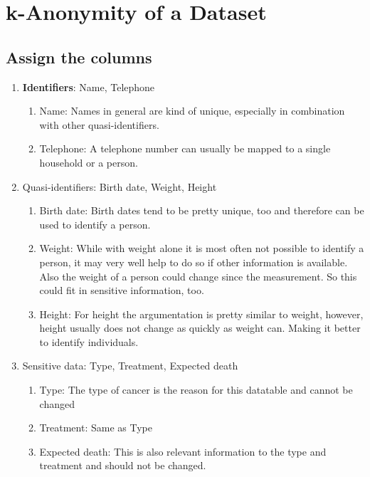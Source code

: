 
\section{k-Anonymity of a Dataset}

\subsection{Assign the columns}
\begin{enumerate}
\item \textbf{Identifiers}: Name, Telephone 
\begin{enumerate}
\item Name: Names in general are kind of unique, especially in combination
with other quasi-identifiers. 
\item Telephone: A telephone number can usually be mapped to a single household
or a person. 
\end{enumerate}
\item Quasi-identifiers: Birth date, Weight, Height 
\begin{enumerate}
\item Birth date: Birth dates tend to be pretty unique, too and therefore
can be used to identify a person. 
\item Weight: While with weight alone it is most often not possible to identify
a person, it may very well help to do so if other information is available.
Also the weight of a person could change since the measurement. So
this could fit in sensitive information, too. 
\item Height: For height the argumentation is pretty similar to weight,
however, height usually does not change as quickly as weight can.
Making it better to identify individuals. 
\end{enumerate}
\item Sensitive data: Type, Treatment, Expected death 
\begin{enumerate}
\item Type: The type of cancer is the reason for this datatable and cannot
be changed 
\item Treatment: Same as Type 
\item Expected death: This is also relevant information to the type and
treatment and should not be changed. 
\end{enumerate}
\end{enumerate}

